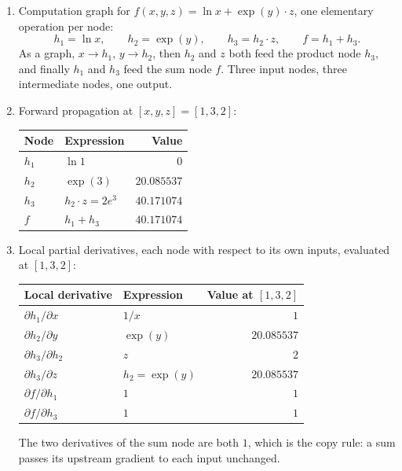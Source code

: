 \documentclass[11pt]{article}
\begin{document}
\begin{enumerate}
  \item Computation graph for $f(x,y,z) = \ln x + \exp(y)\cdot z$, one elementary operation per node:
        \[
          h_1 = \ln x, \qquad h_2 = \exp(y), \qquad h_3 = h_2 \cdot z, \qquad f = h_1 + h_3 .
        \]
        As a graph, $x \to h_1$, $y \to h_2$, then $h_2$ and $z$ both feed the product node $h_3$, and
        finally $h_1$ and $h_3$ feed the sum node $f$. Three input nodes, three intermediate nodes, one
        output.

  \item Forward propagation at $[x,y,z] = [1,3,2]$:
        \begin{center}
        \begin{tabular}{|l|l|r|}
          \hline
          Node & Expression & Value \\
          \hline
          $h_1$ & $\ln 1$          & $0$ \\
          $h_2$ & $\exp(3)$        & $20.085537$ \\
          $h_3$ & $h_2 \cdot z = 2e^{3}$ & $40.171074$ \\
          $f$   & $h_1 + h_3$      & $40.171074$ \\
          \hline
        \end{tabular}
        \end{center}

  \item Local partial derivatives, each node with respect to its own inputs, evaluated at $[1,3,2]$:
        \begin{center}
        \begin{tabular}{|l|l|r|}
          \hline
          Local derivative & Expression & Value at $[1,3,2]$ \\
          \hline
          $\partial h_1/\partial x$   & $1/x$        & $1$ \\
          $\partial h_2/\partial y$   & $\exp(y)$    & $20.085537$ \\
          $\partial h_3/\partial h_2$ & $z$          & $2$ \\
          $\partial h_3/\partial z$   & $h_2 = \exp(y)$ & $20.085537$ \\
          $\partial f/\partial h_1$   & $1$          & $1$ \\
          $\partial f/\partial h_3$   & $1$          & $1$ \\
          \hline
        \end{tabular}
        \end{center}
        The two derivatives of the sum node are both $1$, which is the copy rule: a sum passes its
        upstream gradient to each input unchanged.


\end{enumerate}
\end{document}
